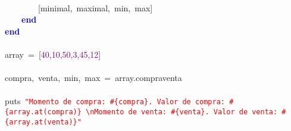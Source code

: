 \mbox{} \\
\mbox{}\ \ \ \ \ \ \ \ \textcolor{BrickRed}{[}minimal\textcolor{BrickRed}{,}\ maximal\textcolor{BrickRed}{,}\ min\textcolor{BrickRed}{,}\ max\textcolor{BrickRed}{]}\  \\
\mbox{}\ \ \ \ \textbf{\textcolor{Blue}{end}}\  \\
\mbox{}\textbf{\textcolor{Blue}{end}} \\
\mbox{} \\
\mbox{}array\ \textcolor{BrickRed}{=}\ \textcolor{BrickRed}{[}\textcolor{Purple}{40}\textcolor{BrickRed}{,}\textcolor{Purple}{10}\textcolor{BrickRed}{,}\textcolor{Purple}{50}\textcolor{BrickRed}{,}\textcolor{Purple}{3}\textcolor{BrickRed}{,}\textcolor{Purple}{45}\textcolor{BrickRed}{,}\textcolor{Purple}{12}\textcolor{BrickRed}{]} \\
\mbox{} \\
\mbox{}compra\textcolor{BrickRed}{,}\ venta\textcolor{BrickRed}{,}\ min\textcolor{BrickRed}{,}\ max\ \textcolor{BrickRed}{=}\ array\textcolor{BrickRed}{.}compraventa \\
\mbox{} \\
\mbox{}puts\ \texttt{\textcolor{Red}{"{}Momento\ de\ compra:\ \#\{compra\}.\ Valor\ de\ compra:\ \#\{array.at(compra)\}\ \textbackslash{}nMomento\ de\ venta:\ \#\{venta\}.\ Valor\ de\ venta:\ \#\{array.at(venta)\}"{}}} \\
\mbox{} \\
\mbox{} \\
\mbox{} \\
\mbox{} \\
\mbox{} \\
\mbox{} \\
\mbox{} \\
\mbox{}
